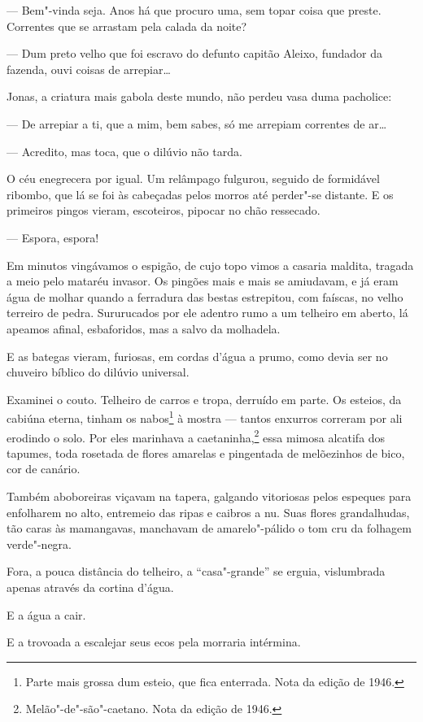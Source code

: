 --- Bem"-vinda seja. Anos há que procuro uma, sem topar coisa que preste.
Correntes que se arrastam pela calada da noite?

--- Dum preto velho que foi escravo do defunto capitão Aleixo, fundador
da fazenda, ouvi coisas de arrepiar\ldots{}

Jonas, a criatura mais gabola deste mundo, não perdeu vasa duma
pacholice:

--- De arrepiar a ti, que a mim, bem sabes, só me arrepiam correntes de
ar\ldots{}

--- Acredito, mas toca, que o dilúvio não tarda.

O céu enegrecera por igual. Um relâmpago fulgurou, seguido de formidável
ribombo, que lá se foi às cabeçadas pelos morros até perder"-se distante.
E os primeiros pingos vieram, escoteiros, pipocar no chão ressecado.

--- Espora, espora!

Em minutos vingávamos o espigão, de cujo topo vimos a casaria maldita,
tragada a meio pelo mataréu invasor. Os pingões mais e mais se
amiudavam, e já eram água de molhar quando a ferradura das bestas
estrepitou, com faíscas, no velho terreiro de pedra. Sururucados por ele
adentro rumo a um telheiro em aberto, lá apeamos afinal, esbaforidos,
mas a salvo da molhadela.

E as bategas vieram, furiosas, em cordas d'água a prumo, como devia ser
no chuveiro bíblico do dilúvio universal.

Examinei o couto. Telheiro de carros e tropa, derruído em parte. Os
esteios, da cabiúna eterna, tinham os nabos\footnote{Parte mais grossa
  dum esteio, que fica enterrada. Nota da edição de 1946.} à mostra ---
tantos enxurros correram por ali erodindo o solo. Por eles marinhava a
caetaninha,\footnote{Melão"-de"-são"-caetano. Nota da edição de 1946.} essa
mimosa alcatifa dos tapumes, toda rosetada de flores amarelas e
pingentada de melõezinhos de bico, cor de canário.

Também aboboreiras viçavam na tapera, galgando vitoriosas pelos espeques
para enfolharem no alto, entremeio das ripas e caibros a nu. Suas flores
grandalhudas, tão caras às mamangavas, manchavam de amarelo"-pálido o tom
cru da folhagem verde"-negra.

Fora, a pouca distância do telheiro, a ``casa"-grande'' se erguia,
vislumbrada apenas através da cortina d'água.

E a água a cair.

E a trovoada a escalejar seus ecos pela morraria intérmina.


